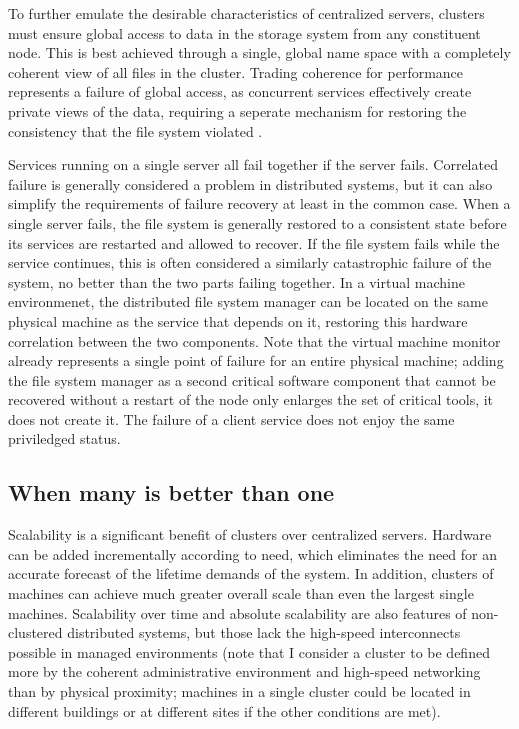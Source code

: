 To further emulate the desirable characteristics of centralized servers, clusters must ensure global access to data in the storage system from any constituent node. This is best achieved through a single, global name space with a completely coherent view of all files in the cluster. Trading coherence for performance represents a failure of global access, as concurrent services effectively create private views of the data, requiring a seperate mechanism for restoring the consistency that the file system violated \cite{birrell93}.

Services running on a single server all fail together if the server fails. Correlated failure is generally considered a problem in distributed systems, but it can also simplify the requirements of failure recovery at least in the common case. When a single server fails, the file system is generally restored to a consistent state before its services are restarted and allowed to recover. If the file system fails while the service continues, this is often considered a similarly catastrophic failure of the system, no better than the two parts failing together. In a virtual machine environmenet, the distributed file system manager can be located on the same physical machine as the service that depends on it, restoring this hardware correlation between the two components. Note that the virtual machine monitor already represents a single point of failure for an entire physical machine; adding the file system manager as a second critical software component that cannot be recovered without a restart of the node only enlarges the set of critical tools, it does not create it. The failure of a client service does not enjoy the same priviledged status.

\subsection{When many is better than one}

Scalability is a significant benefit of clusters over centralized servers. Hardware can be added incrementally according to need, which eliminates the need for an accurate forecast of the lifetime demands of the system. In addition, clusters of machines can achieve much greater overall scale than even the largest single machines. Scalability over time and absolute scalability are also features of non-clustered distributed systems, but those lack the high-speed interconnects possible in managed environments (note that I consider a cluster to be defined more by the coherent administrative environment and high-speed networking than by physical proximity; machines in a single cluster could be located in different buildings or at different sites if the other conditions are met).

